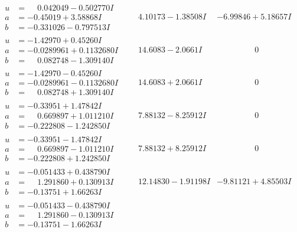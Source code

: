 \documentclass[1p]{elsarticle_modified}
\theoremstyle{definition}
\begin{document}
$$\begin{array}{c|c|c}
\begin{aligned}
u &= \phantom{-}0.042049 - 0.502770 I \\
a &= -0.45019 + 3.58868 I \\
b &= -0.331026 - 0.797513 I\end{aligned}
 & \phantom{-}4.10173 - 1.38508 I & -6.99846 + 5.18657 I \\ \hline\begin{aligned}
u &= -1.42970 + 0.45260 I \\
a &= -0.0289961 + 0.1132680 I \\
b &= \phantom{-}0.082748 - 1.309140 I\end{aligned}
 & \phantom{-}14.6083 - 2.0661 I & \phantom{-0.000000 } 0 \\ \hline\begin{aligned}
u &= -1.42970 - 0.45260 I \\
a &= -0.0289961 - 0.1132680 I \\
b &= \phantom{-}0.082748 + 1.309140 I\end{aligned}
 & \phantom{-}14.6083 + 2.0661 I & \phantom{-0.000000 } 0 \\ \hline\begin{aligned}
u &= -0.33951 + 1.47842 I \\
a &= \phantom{-}0.669897 + 1.011210 I \\
b &= -0.222808 - 1.242850 I\end{aligned}
 & \phantom{-}7.88132 - 8.25912 I & \phantom{-0.000000 } 0 \\ \hline\begin{aligned}
u &= -0.33951 - 1.47842 I \\
a &= \phantom{-}0.669897 - 1.011210 I \\
b &= -0.222808 + 1.242850 I\end{aligned}
 & \phantom{-}7.88132 + 8.25912 I & \phantom{-0.000000 } 0 \\ \hline\begin{aligned}
u &= -0.051433 + 0.438790 I \\
a &= \phantom{-}1.291860 + 0.130913 I \\
b &= -0.13751 + 1.66263 I\end{aligned}
 & \phantom{-}12.14830 - 1.91198 I & -9.81121 + 4.85503 I \\ \hline\begin{aligned}
u &= -0.051433 - 0.438790 I \\
a &= \phantom{-}1.291860 - 0.130913 I \\
b &= -0.13751 - 1.66263 I\end{aligned}

\end{array}$$
\end{document}
